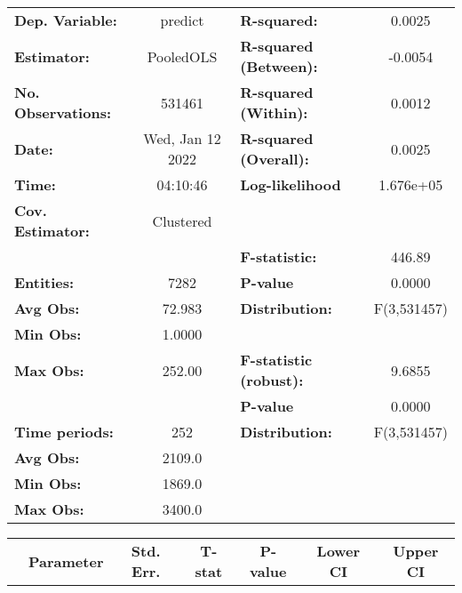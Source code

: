 \begin{center}
\begin{tabular}{lclc}
\toprule
\textbf{Dep. Variable:}    &      predict       & \textbf{  R-squared:         }   &      0.0025      \\
\textbf{Estimator:}        &     PooledOLS      & \textbf{  R-squared (Between):}  &     -0.0054      \\
\textbf{No. Observations:} &       531461       & \textbf{  R-squared (Within):}   &      0.0012      \\
\textbf{Date:}             &  Wed, Jan 12 2022  & \textbf{  R-squared (Overall):}  &      0.0025      \\
\textbf{Time:}             &      04:10:46      & \textbf{  Log-likelihood     }   &    1.676e+05     \\
\textbf{Cov. Estimator:}   &     Clustered      & \textbf{                     }   &                  \\
\textbf{}                  &                    & \textbf{  F-statistic:       }   &      446.89      \\
\textbf{Entities:}         &        7282        & \textbf{  P-value            }   &      0.0000      \\
\textbf{Avg Obs:}          &       72.983       & \textbf{  Distribution:      }   &   F(3,531457)    \\
\textbf{Min Obs:}          &       1.0000       & \textbf{                     }   &                  \\
\textbf{Max Obs:}          &       252.00       & \textbf{  F-statistic (robust):} &      9.6855      \\
\textbf{}                  &                    & \textbf{  P-value            }   &      0.0000      \\
\textbf{Time periods:}     &        252         & \textbf{  Distribution:      }   &   F(3,531457)    \\
\textbf{Avg Obs:}          &       2109.0       & \textbf{                     }   &                  \\
\textbf{Min Obs:}          &       1869.0       & \textbf{                     }   &                  \\
\textbf{Max Obs:}          &       3400.0       & \textbf{                     }   &                  \\
\bottomrule
\end{tabular}
\begin{tabular}{lcccccc}
                & \textbf{Parameter} & \textbf{Std. Err.} & \textbf{T-stat} & \textbf{P-value} & \textbf{Lower CI} & \textbf{Upper CI}  \\

\end{tabular}
\end{center}
